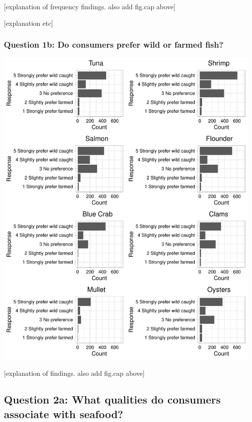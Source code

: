 \documentclass[
  12pt,
]{article}
\begin{document}
{[}explanation of frequency findings. also add fig.cap above{]}

{[}explanation etc{]}

\hypertarget{question-1b-do-consumers-prefer-wild-or-farmed-fish}{%
\subsubsection{Question 1b: Do consumers prefer wild or farmed
fish?}\label{question-1b-do-consumers-prefer-wild-or-farmed-fish}}

\includegraphics{Final_rmd_files/figure-latex/preference-1.pdf}

{[}explanation of findings. also add fig.cap above{]}

\hypertarget{question-2a-what-qualities-do-consumers-associate-with-seafood}{%
\subsection{Question 2a: What qualities do consumers associate with
seafood?}\label{question-2a-what-qualities-do-consumers-associate-with-seafood}}
\end{document}

